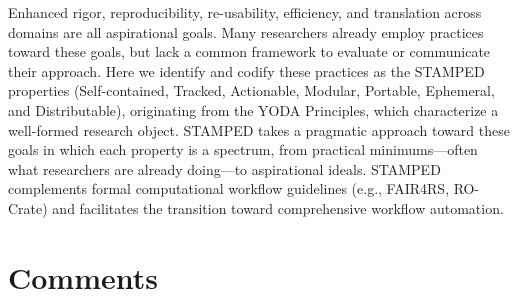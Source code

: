 \documentclass{article}
\begin{document}
Enhanced rigor, reproducibility, re-usability, efficiency, and translation across domains are all aspirational goals.
Many researchers already employ practices toward these goals, but lack a common framework to evaluate or communicate their approach.
Here we identify and codify these practices as the STAMPED properties (Self-contained, Tracked, Actionable, Modular, Portable, Ephemeral, and Distributable), originating from the YODA Principles\cite{hanke_yoda_2018},
which characterize a well-formed research object.
STAMPED takes a pragmatic approach toward these goals in which each property is a spectrum, from practical minimums---often what researchers are already doing---to aspirational ideals.
STAMPED complements formal computational workflow guidelines (e.g., FAIR4RS\cite{barker_introducing_2022}, RO-Crate) and facilitates the transition toward comprehensive workflow automation.




\section{Comments}
\end{document}
